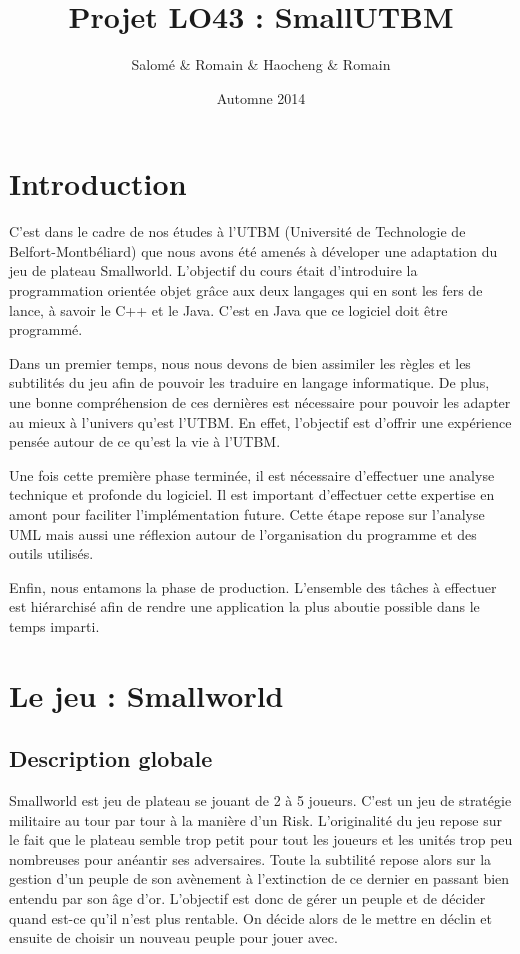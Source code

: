 \documentclass[11pt]{report}
\title{ Projet LO43 : SmallUTBM}
\author{Salomé \bsc{Welche} \& Romain \bsc{Dulieu} \& Haocheng \bsc{Xu} \& Romain \bsc{Thibaud}}
\date{Automne 2014}
\begin{document}
\maketitle

\tableofcontents

\chapter{Introduction}

C'est dans le cadre de nos études à l'UTBM (Université de Technologie de Belfort-Montbéliard) que nous avons été amenés à déveloper une adaptation du jeu de plateau Smallworld\up{\copyright}. L'objectif du cours était d'introduire la programmation orientée objet grâce aux deux langages qui en sont les fers de lance, à savoir le C++ et le Java. C'est en Java que ce logiciel doit être programmé. 

Dans un premier temps, nous nous devons de bien assimiler les règles et les subtilités du jeu afin de pouvoir les traduire en langage informatique. De plus, une bonne compréhension de ces dernières est nécessaire pour pouvoir les adapter au mieux à l'univers qu'est l'UTBM. En effet, l'objectif est d'offrir une expérience pensée autour de ce qu'est la vie à l'UTBM.

Une fois cette première phase terminée, il est nécessaire d'effectuer une analyse technique et profonde du logiciel. Il est important d'effectuer cette expertise en amont pour faciliter l'implémentation future. Cette étape repose sur l'analyse UML mais aussi une réflexion autour de l'organisation du programme et des outils utilisés.

Enfin, nous entamons la phase de production. L'ensemble des tâches à effectuer est hiérarchisé afin de rendre une application la plus aboutie possible dans le temps imparti.

\chapter{Le jeu : Smallworld}

	\section{Description globale}
		Smallworld\up{\copyright} est jeu de plateau se jouant de 2 à 5 joueurs. C'est un jeu de stratégie militaire au tour par tour à la manière d'un Risk\up{\copyright}. L'originalité du jeu repose sur le fait que le plateau semble trop petit pour tout les joueurs et les unités trop peu nombreuses pour anéantir ses adversaires. Toute la subtilité repose alors sur la gestion d'un peuple de son avènement à l'extinction de ce dernier en passant bien entendu par son âge d'or. L'objectif est donc de gérer un peuple et de décider quand est-ce qu'il n'est plus rentable. On décide alors de le mettre en déclin et ensuite de choisir un nouveau peuple pour jouer avec. 
		
\end{document}
